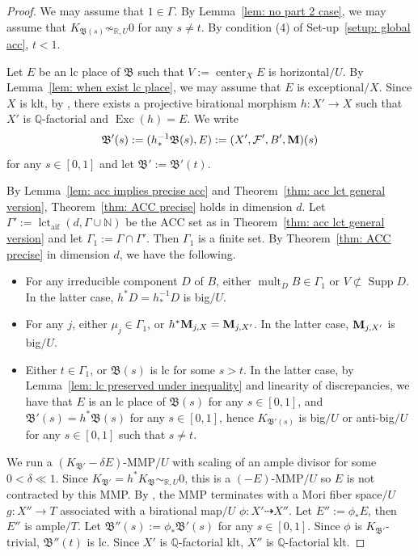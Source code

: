 \documentclass[11pt,reqno]{amsart}
\numberwithin{equation}{section}
\newcommand{\Mm}{{\bf{M}}}
\newcommand{\Center}{\operatorname{center}}
\newcommand{\Exc}{\operatorname{Exc}}
\newcommand{\aif}{{\operatorname{aif}}}
\newcommand{\lct}{\operatorname{lct}}
\newcommand{\Supp}{\operatorname{Supp}}
\newcommand{\mult}{\operatorname{mult}}
\newcommand{\Bb}{{\mathfrak{B}}}
\newcommand{\Ff}{\mathcal{F}}
\newcommand{\Ii}{\Gamma}
\theoremstyle{definition}
\begin{document}
\begin{proof}
We may assume that $1\in\Ii$. By Lemma~\ref{lem: no part 2 case}, we may assume that $K_{\Bb(s)}\not\sim_{\mathbb R,U}0$ for any $s\neq t$. By condition (4) of Set-up~\ref{setup: global acc}, $t<1$.

Let $E$ be an lc place of $\Bb$ such that $V:=\Center_XE$ is horizontal$/U$. 
By Lemma~\ref{lem: when exist lc place}, we may assume that $E$ is exceptional$/X$. Since $X$ is klt, by \cite[Theorem~2.2.3]{Cas+25a}, there exists a projective birational morphism $h\colon X'\rightarrow X$ such that $X'$ is $\mathbb Q$-factorial and $\Exc(h)=E$. We write
$$\Bb'(s):=(h^{-1}_*\Bb(s),E):=(X',\Ff',B',\Mm)(s)$$
for any $s\in [0,1]$ and let $\Bb':=\Bb'(t)$.

By Lemma~\ref{lem: acc implies precise acc} and Theorem~\ref{thm: acc lct general version}, Theorem~\ref{thm: ACC precise} holds in dimension $d$. Let $\Ii':=\lct_{\aif}(d,\Ii\cup\mathbb N)$ be the ACC set as in Theorem~\ref{thm: acc lct general version} and let $\Ii_1:=\Ii\cap\Ii'$. Then $\Ii_1$ is a finite set. By Theorem~\ref{thm: ACC precise} in dimension $d$, we have the following.
\begin{itemize}
    \item For any irreducible component $D$ of $B$, either $\mult_DB\in\Ii_1$ or $V\not\subset\Supp D$. In the latter case, $h^*D=h^{-1}_*D$ is big$/U$.
    \item For any $j$, either $\mu_j\in\Ii_1$, or $h^*\Mm_{j,X}=\Mm_{j,X'}$. In the latter case, $\Mm_{j,X'}$ is big$/U$.
    \item Either $t\in\Ii_1$, or $\Bb(s)$ is lc for some $s>t$. In the latter case, by Lemma~\ref{lem: lc preserved under inequality} and linearity of discrepancies, we have that $E$ is an lc place of $\Bb(s)$ for any $s\in [0,1]$, and $\Bb'(s)=h^*\Bb(s)$ for any $s\in [0,1]$, hence $K_{\Bb'(s)}$ is big$/U$ or anti-big$/U$ for any $s\in [0,1]$ such that $s\neq t$.
\end{itemize}
We run a $(K_{\Bb'}-\delta E)$-MMP$/U$ with scaling of an ample divisor for some $0<\delta\ll 1$. Since $K_{\Bb'}=h^*K_{\Bb}\sim_{\mathbb R,U}0$, this is a $(-E)$-MMP$/U$ so $E$ is not contracted by this MMP. By \cite[Theorem~2.1.5]{Cas+25a}, the MMP terminates with a Mori fiber space$/U$ $g: X''\rightarrow T$ associated with a birational map$/U$ $\phi\colon X'\dashrightarrow X''$. Let $E'':=\phi_*E$, then $E''$ is ample$/T$. Let $\Bb''(s):=\phi_*\Bb'(s)$ for any $s\in [0,1]$. Since $\phi$ is $K_{\Bb'}$-trivial, $\Bb''(t)$ is lc. Since $X'$ is $\mathbb Q$-factorial klt, $X''$ is $\mathbb Q$-factorial klt.


\end{proof}
\end{document}
